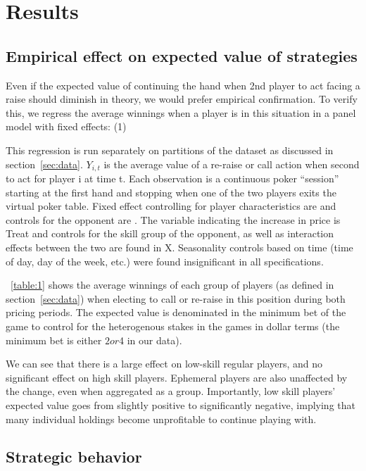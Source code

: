 \documentclass[12pt]{article}
\begin{document}
\section{Results} \label{sec:result}

\subsection{Empirical effect on expected value of strategies} \label{sec:strategy}

Even if the expected value of continuing the hand when 2nd player to act facing a raise should diminish in theory, we would prefer empirical confirmation. To verify this, we regress the average winnings when a player is in this situation in a panel model with fixed effects:
(1)

This regression is run separately on partitions of the dataset as discussed in section~\ref{sec:data}. $Y_{i, t}$  is the average value of a re-raise or call action when second to act for player i at time t. Each observation is a continuous poker “session” starting at the first hand and stopping when one of the two players exits the virtual poker table. Fixed effect controlling for player characteristics are  and controls for the opponent are . The variable indicating the increase in price is Treat and controls for the skill group of the opponent, as well as interaction effects between the two are found in X. Seasonality controls based on time (time of day, day of the week, etc.) were found insignificant in all specifications.

~\ref{table:1} shows the average winnings of each group of players (as defined in section~\ref{sec:data}) when electing to call or re-raise in this position during both pricing periods. The expected value is denominated in the minimum bet of the game to control for the heterogenous stakes in the games in dollar terms (the minimum bet is either $2 or $4 in our data).

We can see that there is a large effect on low-skill regular players, and no significant effect on high skill players. Ephemeral players are also unaffected by the change, even when aggregated as a group. Importantly, low skill players’ expected value goes from slightly positive to significantly negative, implying that many individual holdings become unprofitable to continue playing with.

\subsection{Strategic behavior} \label{sec:behavior}
\end{document}
